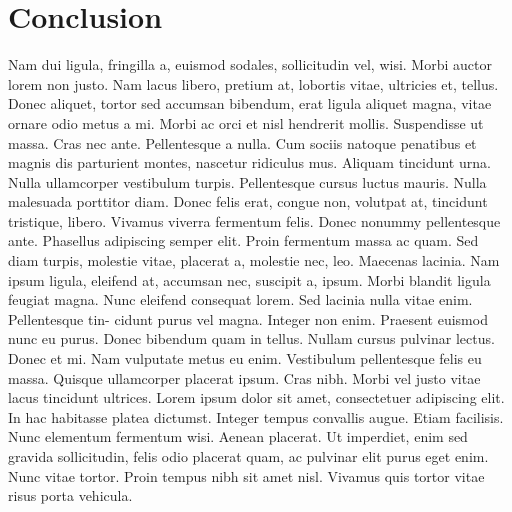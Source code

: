 \documentclass{article}
\begin{document}
\section{Conclusion}
\label{sec:conclusion}

	Nam dui ligula, fringilla a, euismod sodales, sollicitudin vel, wisi. Morbi auctor lorem non justo.
	Nam lacus libero, pretium at, lobortis vitae, ultricies et, tellus. Donec aliquet, tortor sed accumsan
	bibendum, erat ligula aliquet magna, vitae ornare odio metus a mi. Morbi ac orci et nisl hendrerit
	mollis. Suspendisse ut massa. Cras nec ante. Pellentesque a nulla. Cum sociis natoque penatibus
	et magnis dis parturient montes, nascetur ridiculus mus. Aliquam tincidunt urna. Nulla ullamcorper
	vestibulum turpis. Pellentesque cursus luctus mauris.
	Nulla malesuada porttitor diam. Donec felis erat, congue non, volutpat at, tincidunt tristique, libero.
	Vivamus viverra fermentum felis. Donec nonummy pellentesque ante. Phasellus adipiscing semper
	elit. Proin fermentum massa ac quam. Sed diam turpis, molestie vitae, placerat a, molestie nec, leo.
	Maecenas lacinia. Nam ipsum ligula, eleifend at, accumsan nec, suscipit a, ipsum. Morbi blandit
	ligula feugiat magna. Nunc eleifend consequat lorem. Sed lacinia nulla vitae enim. Pellentesque tin-
	cidunt purus vel magna. Integer non enim. Praesent euismod nunc eu purus. Donec bibendum quam
	in tellus. Nullam cursus pulvinar lectus. Donec et mi. Nam vulputate metus eu enim. Vestibulum
	pellentesque felis eu massa.
	Quisque ullamcorper placerat ipsum. Cras nibh. Morbi vel justo vitae lacus tincidunt ultrices. Lorem
	ipsum dolor sit amet, consectetuer adipiscing elit. In hac habitasse platea dictumst. Integer tempus
	convallis augue. Etiam facilisis. Nunc elementum fermentum wisi. Aenean placerat. Ut imperdiet,
	enim sed gravida sollicitudin, felis odio placerat quam, ac pulvinar elit purus eget enim. Nunc vitae
	tortor. Proin tempus nibh sit amet nisl. Vivamus quis tortor vitae risus porta vehicula.


\clearpage


\end{document}
